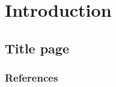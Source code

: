 \section{Introduction}

\subsection{Title page}

\begin{frame}

\titlepage


\end{frame}

\begin{frame}
\frametitle{References}

\printbibliography


\end{frame}

